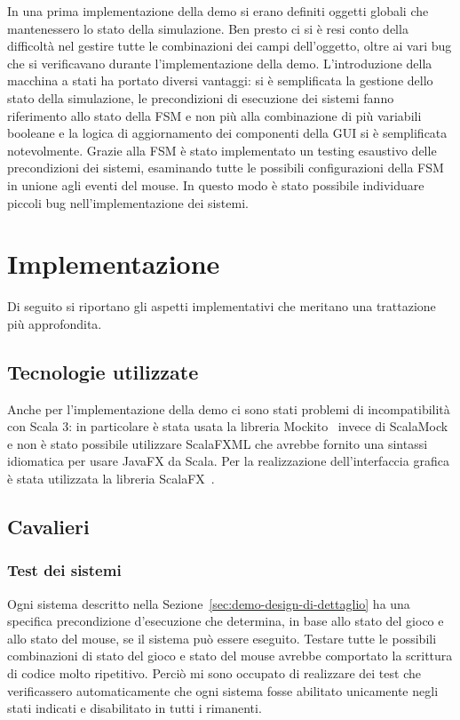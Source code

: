 In una prima implementazione della demo si erano definiti oggetti globali che mantenessero lo stato della simulazione.
Ben presto ci si è resi conto della difficoltà nel gestire tutte le combinazioni dei campi dell'oggetto, oltre
ai vari bug che si verificavano durante l'implementazione della demo.
L'introduzione della macchina a stati ha portato diversi vantaggi: si è semplificata la gestione dello
stato della simulazione, le precondizioni di esecuzione dei sistemi fanno riferimento allo stato della FSM e non più
alla combinazione di più variabili booleane e la logica di aggiornamento dei componenti della GUI si è semplificata
notevolmente.
Grazie alla FSM è stato implementato un testing esaustivo delle precondizioni dei sistemi, esaminando tutte
le possibili configurazioni della FSM in unione agli eventi del mouse.
In questo modo è stato possibile individuare piccoli bug nell'implementazione dei sistemi.

\section{Implementazione}\label{sec:demo-implementazione}
Di seguito si riportano gli aspetti implementativi che meritano una trattazione più approfondita.

\subsection{Tecnologie utilizzate}\label{subsec:demo-tecnologie-utilizzate}
Anche per l'implementazione della demo ci sono stati problemi di incompatibilità con Scala 3:
in particolare è stata usata la libreria Mockito~\cite{mockito} invece di ScalaMock e non è stato possibile utilizzare
ScalaFXML che avrebbe fornito una sintassi idiomatica per usare JavaFX da Scala\@.
Per la realizzazione dell'interfaccia grafica è stata utilizzata la libreria ScalaFX~\cite{scalafx}\@.

\subsection{Cavalieri}\label{subsec:demo-cavalieri}
\subsubsection{Test dei sistemi}
Ogni sistema descritto nella Sezione~\ref{sec:demo-design-di-dettaglio} ha una specifica precondizione d'esecuzione
che determina, in base allo stato del gioco e allo stato del mouse, se il sistema può essere eseguito.
Testare tutte le possibili combinazioni di stato del gioco e stato del mouse avrebbe comportato la scrittura di codice
molto ripetitivo.
Perciò mi sono occupato di realizzare dei test che verificassero automaticamente che ogni sistema
fosse abilitato unicamente negli stati indicati e disabilitato in tutti i rimanenti.

